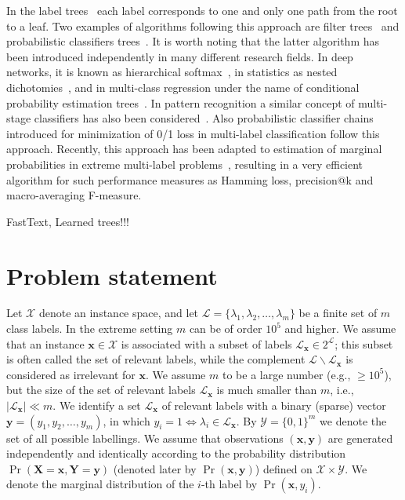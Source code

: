 \documentclass{article}
\renewcommand{\vec}[1]{\boldsymbol{#1}}
\newcommand{\bx}{\vec{x}}
\newcommand{\by}{\vec{y}}
\newcommand{\bX}{\vec{X}}
\newcommand{\bY}{\vec{Y}}
\newcommand{\calX}{\mathcal{X}}
\newcommand{\calY}{\mathcal{Y}}
\newcommand{\calL}{\mathcal{L}}
\newcommand{\sectionBefore}{-0pt}
\newcommand{\sectionAfter}{-0pt}
\begin{document}
In the label trees~\citep{Bengio_et_al_2010} each label corresponds to one and only one path from the root to a leaf. Two examples of algorithms following this approach are filter trees~\citep{Beygelzimer_et_al_2009a,Li_Lin_2014} and probabilistic classifiers trees~\citep{Dembczynski_et_al_2016}. It is worth noting that the latter algorithm has been introduced independently in many different research fields. In deep networks, it is known as hierarchical softmax~\citep{Morin_Bengio_2005}, in statistics as nested dichotomies~\citep{Fox_1997}, and in multi-class regression under the name of conditional probability estimation trees~\citep{Beygelzimer_et_al_2009b}. In pattern recognition a similar concept of multi-stage classifiers has also been considered~\citep{Kurzynski_1988}. Also probabilistic classifier chains~\citep{Dembczynski_et_al_2010c} introduced for minimization of 0/1 loss in multi-label classification follow this approach. Recently, this approach has been adapted to estimation of marginal probabilities in extreme multi-label problems~\citep{Jasinska_et_al_2016}, resulting in a very efficient algorithm for such performance measures as Hamming loss, precision@k and macro-averaging F-measure.

FastText, Learned trees!!!

\vspace{\sectionBefore}
\section{Problem statement}
\label{sec:problem_statement}
\vspace{\sectionAfter}

Let $\calX$ denote an instance space, and let $\calL = \{\lambda_1,\lambda_2, \ldots,\lambda_m\}$ be a finite set of $m$ class labels. 
In the extreme setting $m$ can be of order $10^5$ and higher.
We assume that an instance $\bx \in \calX$ is associated with a subset of
labels $\calL_{\bx} \in 2^\calL$; this subset is often called the set of relevant labels, while the complement
$\calL \backslash \calL_{\bx}$ is considered as irrelevant for $\bx$. We assume $m$ to be a large number (e.g., $\ge 10^5$), but the size of the set of relevant labels $\calL_{\bx}$ is much smaller than $m$, i.e., $|\calL_{\bx}| \ll m$. We identify a set $\calL_{\bx}$ of relevant labels with a binary (sparse)
vector $\by = (y_1,y_2, \ldots, y_m)$, in which $y_i = 1 \Leftrightarrow \lambda_i \in \calL_{\bx}$. By $\calY = \{0, 1\}^m$ we denote the set of all
possible labellings.
We assume that observations $(\bx, \by)$ are generated independently and identically according to the
probability distribution $\Pr(\bX = \bx,\bY = \by)$ (denoted later by $\Pr(\bx, \by)$) defined on $\calX \times \calY$. We denote the marginal distribution of the $i$-th label by $\Pr(\bx,y_i)$. %
\end{document}
